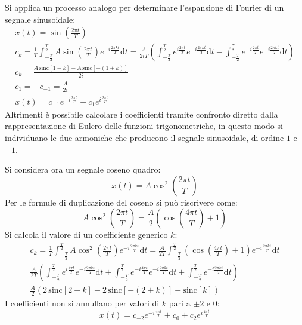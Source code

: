 \documentclass{article}
\newcommand{\sinc}{\mathrm{sinc}}
\newcommand{\df}{\mathrm{d}}
\numberwithin{equation}{subsection}
\begin{document}
Si applica un processo analogo per determinare l'espansione di Fourier di un segnale sinusoidale: 
\begin{gather*}
    x(t)=\sin\left(\displaystyle\frac{2\pi t}{T}\right)\\
    c_k=\displaystyle\frac{1}{T}\int_{-\frac{T}{2}}^{\frac{T}{2}}A\sin\left(\frac{2\pi t}{T}\right)e^{-i\frac{2\pi kt}{T}}\df t=
    \frac{A}{2iT}\left(\int_{-\frac{T}{2}}^{\frac{T}{2}}e^{i\frac{2\pi t}{T}}e^{-i\frac{2\pi kt}{T}}\df t-\int_{-\frac{T}{2}}^{\frac{T}{2}}e^{-i\frac{2\pi t}{T}}e^{-i\frac{2\pi kt}{T}}\df t\right)\\
    \displaystyle c_k=\frac{A\,\sinc[1-k]-A\,\sinc[-(1+k)]}{2i}\\
    c_1=-c_{-1}=\frac{A}{2i}\\
    x(t)=c_{-1}e^{-i\frac{2\pi t}{T}}+c_1e^{i\frac{2\pi t}{T}}
\end{gather*}
Altrimenti è possibile calcolare i coefficienti tramite confronto diretto dalla rappresentazione di Eulero delle funzioni trigonometriche, in questo modo si individuano le due 
armoniche che producono il segnale sinusoidale, di ordine $1$ e $-1$. 


Si considera ora un segnale coseno quadro:
\begin{equation}
    x(t)=A\cos^2\left(\frac{2\pi t}{T}\right)
\end{equation}
Per le formule di duplicazione del coseno si può riscrivere come:
\begin{equation*}
    A\cos^2\left(\frac{2\pi t}{T}\right)=\frac{A}{2}\left(\cos\left(\frac{4\pi t}{T}\right)+1\right)
\end{equation*}
Si calcola il valore di un coefficiente generico $k$:
\begin{gather*}
    c_k=\displaystyle\frac{1}{T}\int_{-\frac{T}{2}}^{\frac{T}{2}}A\cos^2\left(\frac{2\pi t}{T}\right)e^{-i\frac{2\pi kt}{T}}\df t=
    \frac{A}{2T}\int_{-\frac{T}{2}}^{\frac{T}{2}}\left(\cos\left(\frac{4\pi t}{T}\right)+1\right)e^{-i\frac{2\pi kt}{T}}\df t\\
    \displaystyle\frac{A}{2T}\left(\int_{-\frac{T}{2}}^{\frac{T}{2}}e^{i\frac{4\pi t}{T}}e^{-i\frac{2\pi kt}{T}}\df t+\int_{-\frac{T}{2}}^{\frac{T}{2}}e^{-i\frac{4\pi t}{T}}e^{-i\frac{2\pi kt}{T}}\df t+\int_{-\frac{T}{2}}^{\frac{T}{2}}e^{-i\frac{2\pi kt}{T}}\df t\right)\\
    \displaystyle\frac{A}{2}\left(2\,\sinc[2-k]-2\,\sinc[-(2+k)]+\sinc[k]\right)
\end{gather*}
I coefficienti non si annullano per valori di $k$ pari a $\pm2$ e $0$:
\begin{equation*}
    x(t)=c_{-2}e^{-i\frac{4\pi t}{T}}+c_0+c_2e^{i\frac{4\pi t}{T}}
\end{equation*}
\end{document}
